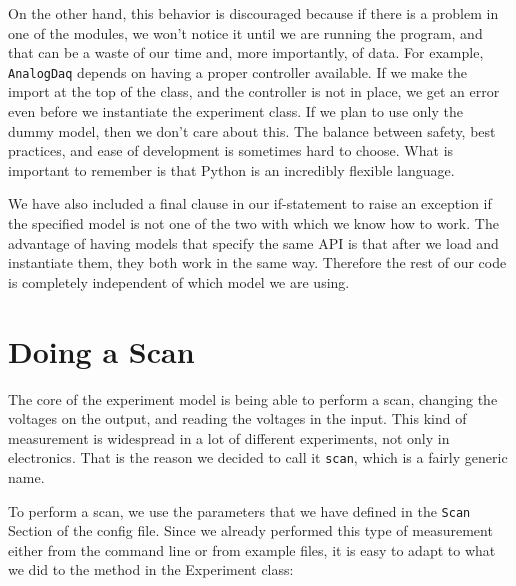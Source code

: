 On the other hand, this behavior is discouraged because if there is a problem in one of the modules, we won't notice it until we are running the program, and that can be a waste of our time and, more importantly, of data. For example, \texttt{AnalogDaq} depends on having a proper controller available. If we make the import at the top of the class, and the controller is not in place, we get an error even before we instantiate the experiment class. If we plan to use only the dummy model, then we don't care about this. The balance between safety, best practices, and ease of development is sometimes hard to choose. What is important to remember is that Python is an incredibly flexible language.

We have also included a final clause in our if-statement to raise an exception if the specified model is not one of the two with which we know how to work. The advantage of having models that specify the same API is that after we load and instantiate them, they both work in the same way. Therefore the rest of our code is completely independent of which model we are using.


\section{Doing a Scan}\label{section:doing-scan}
The core of the experiment model is being able to perform a scan, changing the voltages on the output, and reading the voltages in the input. This kind of measurement is widespread in a lot of different experiments, not only in electronics. That is the reason we decided to call it \texttt{scan}, which is a fairly generic name.


To perform a scan, we use the parameters that we have defined in the \texttt{Scan} Section of the config file. Since we already performed this type of measurement either from the command line or from example files, it is easy to adapt to what we did to the method in the Experiment class:

